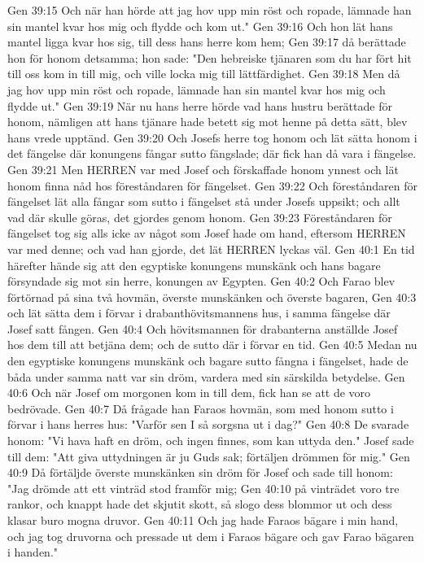 Gen 39:15  Och när han hörde att jag hov upp min röst och ropade, lämnade han sin mantel kvar hos mig och flydde och kom ut."
Gen 39:16  Och hon lät hans mantel ligga kvar hos sig, till dess hans herre kom hem;
Gen 39:17  då berättade hon för honom detsamma; hon sade: "Den hebreiske tjänaren som du har fört hit till oss kom in till mig, och ville locka mig till lättfärdighet.
Gen 39:18  Men då jag hov upp min röst och ropade, lämnade han sin mantel kvar hos mig och flydde ut."
Gen 39:19  När nu hans herre hörde vad hans hustru berättade för honom, nämligen att hans tjänare hade betett sig mot henne på detta sätt, blev hans vrede upptänd.
Gen 39:20  Och Josefs herre tog honom och lät sätta honom i det fängelse där konungens fångar sutto fängslade; där fick han då vara i fängelse.
Gen 39:21  Men HERREN var med Josef och förskaffade honom ynnest och lät honom finna nåd hos föreståndaren för fängelset.
Gen 39:22  Och föreståndaren för fängelset lät alla fångar som sutto i fängelset stå under Josefs uppsikt; och allt vad där skulle göras, det gjordes genom honom.
Gen 39:23  Föreståndaren för fängelset tog sig alls icke av något som Josef hade om hand, eftersom HERREN var med denne; och vad han gjorde, det lät HERREN lyckas väl.
Gen 40:1  En tid härefter hände sig att den egyptiske konungens munskänk och hans bagare försyndade sig mot sin herre, konungen av Egypten.
Gen 40:2  Och Farao blev förtörnad på sina två hovmän, överste munskänken och överste bagaren,
Gen 40:3  och lät sätta dem i förvar i drabanthövitsmannens hus, i samma fängelse där Josef satt fången.
Gen 40:4  Och hövitsmannen för drabanterna anställde Josef hos dem till att betjäna dem; och de sutto där i förvar en tid.
Gen 40:5  Medan nu den egyptiske konungens munskänk och bagare sutto fångna i fängelset, hade de båda under samma natt var sin dröm, vardera med sin särskilda betydelse.
Gen 40:6  Och när Josef om morgonen kom in till dem, fick han se att de voro bedrövade.
Gen 40:7  Då frågade han Faraos hovmän, som med honom sutto i förvar i hans herres hus: "Varför sen I så sorgsna ut i dag?"
Gen 40:8  De svarade honom: "Vi hava haft en dröm, och ingen finnes, som kan uttyda den." Josef sade till dem: "Att giva uttydningen är ju Guds sak; förtäljen drömmen för mig."
Gen 40:9  Då förtäljde överste munskänken sin dröm för Josef och sade till honom: "Jag drömde att ett vinträd stod framför mig;
Gen 40:10  på vinträdet voro tre rankor, och knappt hade det skjutit skott, så slogo dess blommor ut och dess klasar buro mogna druvor.
Gen 40:11  Och jag hade Faraos bägare i min hand, och jag tog druvorna och pressade ut dem i Faraos bägare och gav Farao bägaren i handen."
